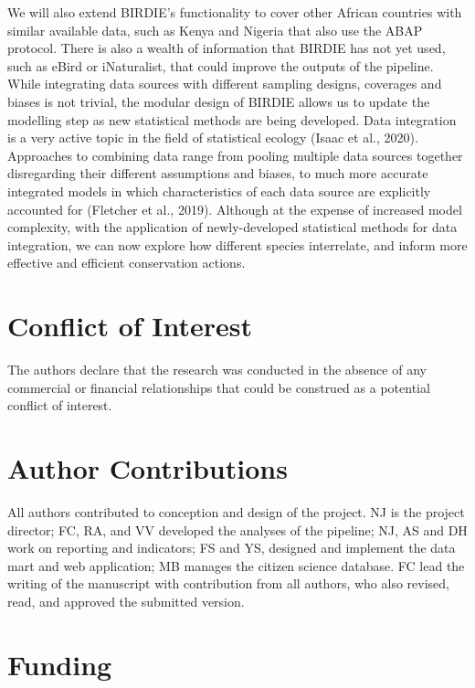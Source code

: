 \documentclass[utf8]{frontiersSCNS}
\begin{document}
We will also extend BIRDIE's functionality to cover other African
countries with similar available data, such as Kenya and Nigeria that
also use the ABAP protocol. There is also a wealth of information that
BIRDIE has not yet used, such as eBird or iNaturalist, that could
improve the outputs of the pipeline. While integrating data sources with
different sampling designs, coverages and biases is not trivial, the
modular design of BIRDIE allows us to update the modelling step as new
statistical methods are being developed. Data integration is a very
active topic in the field of statistical ecology (Isaac et al., 2020).
Approaches to combining data range from pooling multiple data sources
together disregarding their different assumptions and biases, to much
more accurate integrated models in which characteristics of each data
source are explicitly accounted for (Fletcher et al., 2019). Although at
the expense of increased model complexity, with the application of
newly-developed statistical methods for data integration, we can now
explore how different species interrelate, and inform more effective and
efficient conservation actions.

\hypertarget{conflict-of-interest}{%
\section*{Conflict of Interest}\label{conflict-of-interest}}

The authors declare that the research was conducted in the absence of
any commercial or financial relationships that could be construed as a
potential conflict of interest.

\hypertarget{author-contributions}{%
\section*{Author Contributions}\label{author-contributions}}

All authors contributed to conception and design of the project. NJ is
the project director; FC, RA, and VV developed the analyses of the
pipeline; NJ, AS and DH work on reporting and indicators; FS and YS,
designed and implement the data mart and web application; MB manages the
citizen science database. FC lead the writing of the manuscript with
contribution from all authors, who also revised, read, and approved the
submitted version.

\hypertarget{funding}{%
\section*{Funding}\label{funding}}
\end{document}
